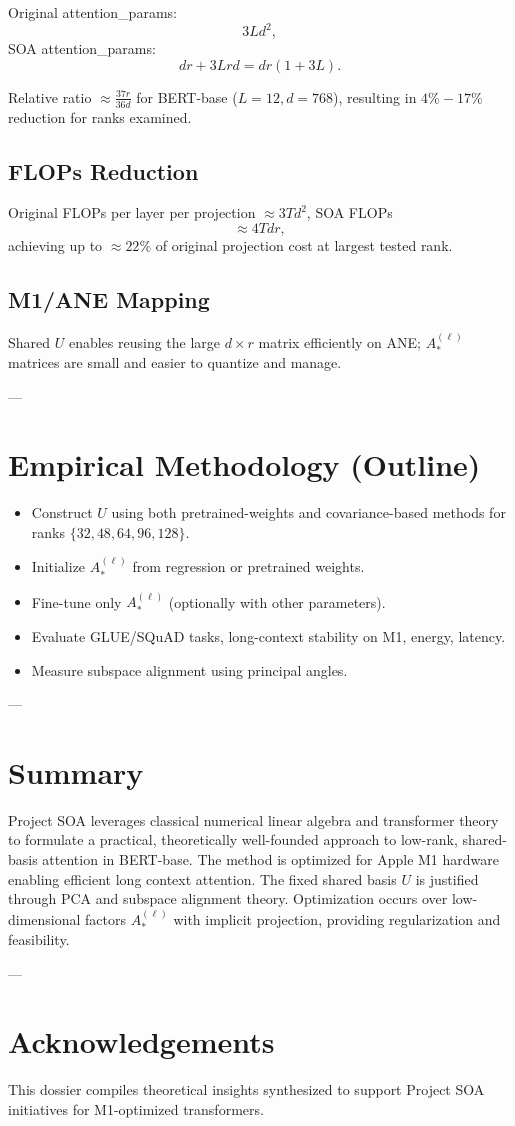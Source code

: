 \documentclass[11pt]{article}
\theoremstyle{definition}
\begin{document}
Original attention\_params:
\[
3 L d^2,
\]
SOA attention\_params:
\[
d r + 3 L r d = d r (1 + 3L).
\]

Relative ratio \(\approx \frac{37 r}{36 d}\) for BERT-base (\(L=12, d=768\)), resulting in \(4\% - 17\%\) reduction for ranks examined.

\subsection{FLOPs Reduction}

Original FLOPs per layer per projection \(\approx 3 T d^2\), SOA FLOPs
\[
\approx 4 T d r,
\]
achieving up to \(\approx 22\%\) of original projection cost at largest tested rank.

\subsection{M1/ANE Mapping}

Shared \(U\) enables reusing the large \(d \times r\) matrix efficiently on ANE; \(A_*^{(\ell)}\) matrices are small and easier to quantize and manage.

---

\section{Empirical Methodology (Outline)}

\begin{itemize}
\item Construct \(U\) using both pretrained-weights and covariance-based methods for ranks \(\{32,48,64,96,128\}\).
\item Initialize \(A_*^{(\ell)}\) from regression or pretrained weights.
\item Fine-tune only \(A_*^{(\ell)}\) (optionally with other parameters).
\item Evaluate GLUE/SQuAD tasks, long-context stability on M1, energy, latency.
\item Measure subspace alignment using principal angles.
\end{itemize}

---

\section{Summary}

Project SOA leverages classical numerical linear algebra and transformer theory to formulate a practical, theoretically well-founded approach to low-rank, shared-basis attention in BERT-base. The method is optimized for Apple M1 hardware enabling efficient long context attention. The fixed shared basis \(U\) is justified through PCA and subspace alignment theory. Optimization occurs over low-dimensional factors \(A_*^{(\ell)}\) with implicit projection, providing regularization and feasibility.

---

\section*{Acknowledgements}

This dossier compiles theoretical insights synthesized to support Project SOA initiatives for M1-optimized transformers.
\end{document}
